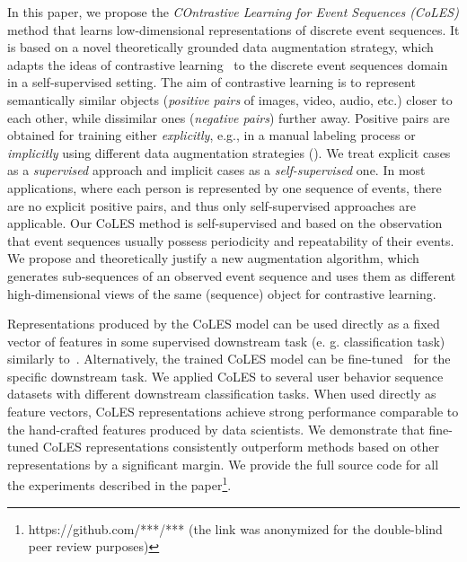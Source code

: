 \documentclass{article}
\begin{document}
In this paper, we propose the \emph{COntrastive Learning for Event Sequences (CoLES)} method that learns low-dimensional representations of discrete event sequences. It is based on a novel theoretically grounded data augmentation strategy, which adapts the ideas of contrastive learning~\citep{Xing2002DistanceML, Hadsell2006DimensionalityRB} to the discrete event sequences domain in a self-supervised setting.
The aim of contrastive learning is to represent semantically similar objects (\textit{positive pairs} of images, video, audio, etc.) closer to each other, while dissimilar ones (\textit{negative pairs}) further away. Positive pairs are obtained for training either {\it explicitly}, e.g., in a manual labeling process or {\it implicitly} using different data augmentation strategies (\cite{Falcon2020AFF}). We treat explicit cases as a {\it supervised} approach and implicit cases as a {\it self-supervised} one. In most applications, where each person is represented by one sequence of events, there are no explicit positive pairs, and thus only self-supervised approaches are applicable. Our CoLES method is self-supervised and based on the observation that event sequences usually possess periodicity and repeatability of their events. We propose and theoretically justify a new augmentation algorithm, which generates sub-sequences of an observed event sequence and uses them as different high-dimensional 
views of the same (sequence) object for contrastive learning.

Representations produced by the CoLES model can be used directly as a fixed vector of features in some supervised downstream task (e. g. classification task) similarly to~\citep{Mikolov2013EfficientEO, Song2017LearningUE, Zhai2019LearningAU}. Alternatively, the trained CoLES model can be fine-tuned~\citep{Devlin2019BERTPO} for the specific downstream task.
We applied CoLES to several user behavior sequence datasets with different downstream classification tasks. When used directly as feature vectors, CoLES representations achieve strong performance comparable to the hand-crafted features produced by data scientists.
We demonstrate that fine-tuned CoLES representations consistently outperform methods based on other representations by a significant margin. %
We provide the full source code for all the experiments described in the paper\footnote{https://github.com/***/*** (the link was anonymized for the double-blind peer review purposes)}.
\end{document}
